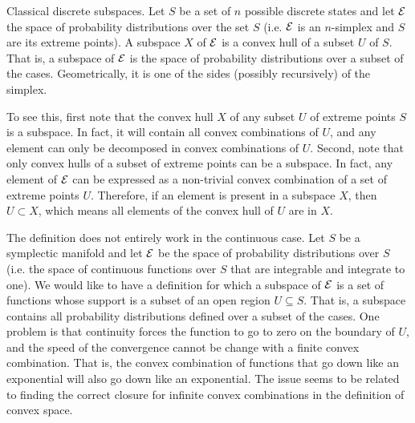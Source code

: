 \begin{example} Classical discrete subspaces.
	Let $S$ be a set of $n$ possible discrete states and let $\mathcal{E}$ the space of probability distributions over the set $S$ (i.e. $\mathcal{E}$ is an $n$-simplex and $S$ are its extreme points). A subspace $X$ of $\mathcal{E}$ is a convex hull of a subset $U$ of $S$. That is, a subspace of $\mathcal{E}$ is the space of probability distributions over a subset of the cases. Geometrically, it is one of the sides (possibly recursively) of the simplex.
	
	To see this, first note that the convex hull $X$ of any subset $U$ of extreme points $S$ is a subspace. In fact, it will contain all convex combinations of $U$, and any element can only be decomposed in convex combinations of $U$. Second, note that only convex hulls of a subset of extreme points can be a subspace. In fact, any element of $\mathcal{E}$ can be expressed as a non-trivial convex combination of a set of extreme points $U$. Therefore, if an element is present in a subspace $X$, then $U \subset X$, which means all elements of the convex hull of $U$ are in $X$.
\end{example}

\begin{remark}
	The definition does not entirely work in the continuous case. Let $S$ be a symplectic manifold and let $\mathcal{E}$ be the space of probability distributions over $S$ (i.e. the space of continuous functions over $S$ that are integrable and integrate to one). We would like to have a definition for which a subspace of $\mathcal{E}$ is a set of functions whose support is a subset of an open region $U \subseteq S$. That is, a subspace contains all probability distributions defined over a subset of the cases. One problem is that continuity forces the function to go to zero on the boundary of $U$, and the speed of the convergence cannot be change with a finite convex combination. That is, the convex combination of functions that go down like an exponential will also go down like an exponential. The issue seems to be related to finding the correct closure for infinite convex combinations in the definition of convex space.
\end{remark}

